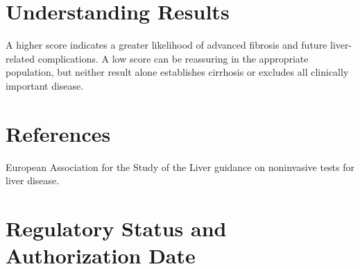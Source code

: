 \section*{Understanding Results}
A higher score indicates a greater likelihood of advanced fibrosis and future liver-related complications. A low score can be reassuring in the appropriate population, but neither result alone establishes cirrhosis or excludes all clinically important disease.

\section*{References}
European Association for the Study of the Liver guidance on noninvasive tests for liver disease.

\clearpage


\section*{Regulatory Status and Authorization Date}

\clearpage
